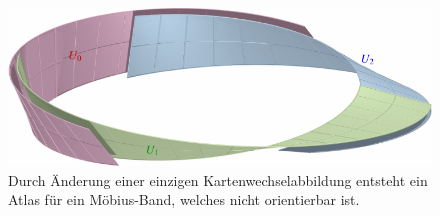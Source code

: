 %
%
%
\begin{figure}
\centering
\includegraphics{chapters/040-green/images/moebius.pdf}
\caption{Durch Änderung einer einzigen Kartenwechselabbildung entsteht
ein Atlas für ein Möbius-Band, welches nicht orientierbar ist.
\label{buch:green:green:fig:moebius}}
\end{figure}
